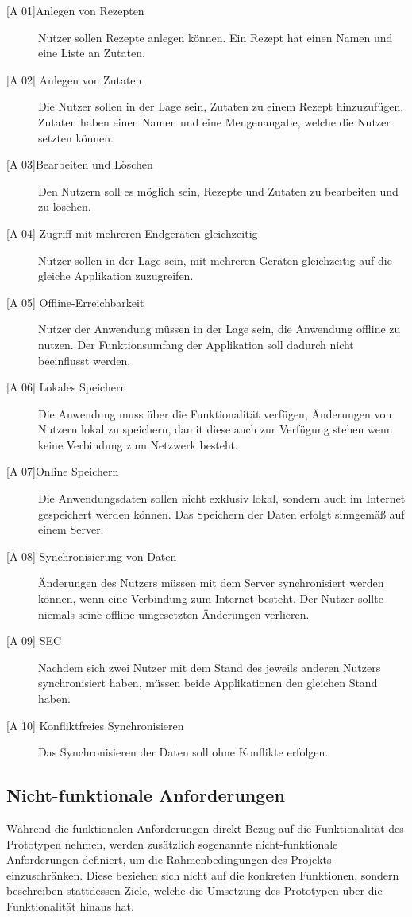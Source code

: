 \documentclass[a4paper, 12pt]{scrreprt}
\begin{document}
\begin{description}
	\item[{[A 01]}Anlegen von Rezepten]
	Nutzer sollen Rezepte anlegen können. Ein Rezept hat einen Namen und eine Liste an Zutaten. 
	\item[{[A 02]} Anlegen von Zutaten]
	Die Nutzer sollen in der Lage sein, Zutaten zu einem Rezept hinzuzufügen. Zutaten haben einen Namen und eine Mengenangabe, welche die Nutzer setzten können.
	\item[{[A 03]}Bearbeiten und Löschen]
	Den Nutzern soll es möglich sein, Rezepte und Zutaten zu bearbeiten und zu löschen. 
	\item[{[A 04]} Zugriff mit mehreren Endgeräten gleichzeitig]
	Nutzer sollen in der Lage sein, mit mehreren Geräten gleichzeitig auf die gleiche Applikation zuzugreifen.
	\item[{[A 05]} Offline-Erreichbarkeit]
	Nutzer der Anwendung müssen in der Lage sein, die Anwendung offline zu nutzen. Der Funktionsumfang der Applikation soll dadurch nicht beeinflusst werden. 
	\item[{[A 06]} Lokales Speichern]
	Die Anwendung muss über die Funktionalität verfügen, Änderungen von Nutzern lokal zu speichern, damit diese auch zur Verfügung stehen wenn keine Verbindung zum Netzwerk besteht.
	\item[{[A 07]}Online Speichern]
	Die Anwendungsdaten sollen nicht exklusiv lokal, sondern auch im Internet gespeichert werden können. Das Speichern der Daten erfolgt sinngemäß auf einem Server. 
	\item[{[A 08]} Synchronisierung von Daten]
	Änderungen des Nutzers müssen mit dem Server synchronisiert werden können, wenn eine Verbindung zum Internet besteht. Der Nutzer sollte niemals seine offline umgesetzten Änderungen verlieren.
	\item[{[A 09]} \ac{SEC}] Nachdem sich zwei Nutzer mit dem Stand des jeweils anderen Nutzers synchronisiert haben, müssen beide Applikationen den gleichen Stand haben.
	\item[{{[A 10]} Konfliktfreies Synchronisieren}] Das Synchronisieren der Daten soll ohne Konflikte erfolgen. 
\end{description}


\subsection{Nicht-funktionale Anforderungen}
Während die funktionalen Anforderungen direkt Bezug auf die Funktionalität des Prototypen nehmen, werden zusätzlich sogenannte nicht-funktionale Anforderungen definiert, um die Rahmenbedingungen des Projekts einzuschränken. Diese beziehen sich nicht auf die konkreten Funktionen, sondern beschreiben stattdessen Ziele, welche die Umsetzung des Prototypen über die Funktionalität hinaus hat. 
\end{document}
